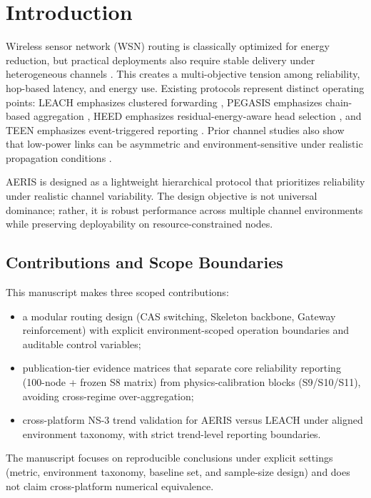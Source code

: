 ﻿\documentclass[sensors,article,submit,moreauthors,pdftex]{Definitions/mdpi}
\begin{document}
\section{Introduction}
Wireless sensor network (WSN) routing is classically optimized for energy reduction, but practical deployments also require stable delivery under heterogeneous channels \cite{Akyildiz2002Survey,Rault2016Energy,Kandris2020}. This creates a multi-objective tension among reliability, hop-based latency, and energy use. Existing protocols represent distinct operating points: LEACH emphasizes clustered forwarding \cite{Heinzelman2000LEACH}, PEGASIS emphasizes chain-based aggregation \cite{Lindsey2002PEGASIS}, HEED emphasizes residual-energy-aware head selection \cite{Younis2004HEED}, and TEEN emphasizes event-triggered reporting \cite{Manjeshwar2001TEEN}. Prior channel studies also show that low-power links can be asymmetric and environment-sensitive under realistic propagation conditions \cite{Zuniga2004,Zuniga2007Asymmetry,Baccour2012RLQE}.

AERIS is designed as a lightweight hierarchical protocol that prioritizes reliability under realistic channel variability. The design objective is not universal dominance; rather, it is robust performance across multiple channel environments while preserving deployability on resource-constrained nodes.

\subsection*{Contributions and Scope Boundaries}
This manuscript makes three scoped contributions:
\begin{itemize}
\item a modular routing design (CAS switching, Skeleton backbone, Gateway reinforcement) with explicit environment-scoped operation boundaries and auditable control variables;
\item publication-tier evidence matrices that separate core reliability reporting (100-node + frozen S8 matrix) from physics-calibration blocks (S9/S10/S11), avoiding cross-regime over-aggregation;
\item cross-platform NS-3 trend validation for AERIS versus LEACH under aligned environment taxonomy, with strict trend-level reporting boundaries.
\end{itemize}
The manuscript focuses on reproducible conclusions under explicit settings (metric, environment taxonomy, baseline set, and sample-size design) and does not claim cross-platform numerical equivalence.
\end{document}
